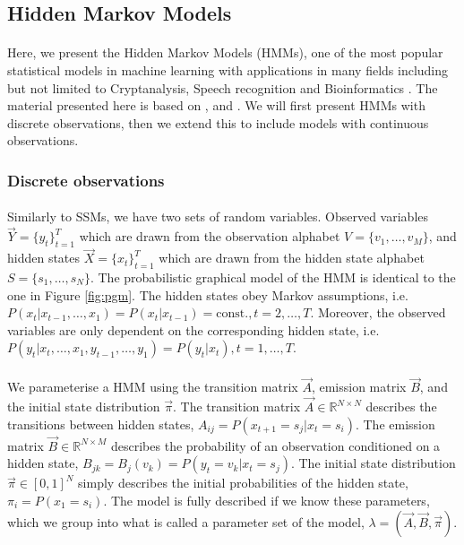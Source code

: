 \subsection{Hidden Markov Models}

\paragraph{}
	Here, we present the Hidden Markov Models (HMMs), one of the most popular statistical models in machine learning with applications in many fields including but not limited to Cryptanalysis, Speech recognition and Bioinformatics \cite{wiki:HMM}. The material presented here is based on \cite{rabiner1989tutorial}, \cite{ramage07} and \cite{mlBook}. We will first present HMMs with discrete observations, then we extend this to include models with continuous observations.
	
\subsubsection{Discrete observations}
\paragraph{}
	Similarly to SSMs, we have two sets of random variables. Observed variables $\vec Y = \{ y_t \}_{t = 1}^T$ which are drawn from the observation alphabet $V = \{v_1, \dotsc, v_M\}$, and hidden states $\vec X = \{ x_t \}_{t = 1}^T$ which are drawn from the hidden state alphabet $S = \{ s_1, \dotsc, s_N \}$. The probabilistic graphical model of the HMM is identical to the one in Figure \ref{fig:pgm}. The hidden states obey Markov assumptions, i.e. $P( x_t | x_{t - 1}, \dotsc, x_1) = P(x_t | x_{t - 1}) = \text{const.}, t = 2, \dotsc, T$. Moreover, the observed variables are only dependent on the corresponding hidden state, i.e. $P( y_t | x_t, \dotsc, x_1, y_{t - 1}, \dotsc, y_1) = P(y_t | x_t), t = 1, \dotsc, T$.
	
\paragraph{}
	We parameterise a HMM using the transition matrix $\vec A$, emission matrix $\vec B$, and the initial state distribution $\vec \pi$. The transition matrix $\vec A \in \mathbb{R}^{N \times N}$ describes the transitions between hidden states, $A_{ij} = P(x_{t + 1} = s_j | x_t = s_i)$. The emission matrix $\vec B \in \mathbb{R}^{N \times M}$ describes the probability of an observation conditioned on a hidden state, $B_{jk} = B_{j}(v_k) = P(y_t = v_k | x_t = s_j)$. The initial state distribution $\vec \pi \in [0, 1]^N$ simply describes the initial probabilities of the hidden state, $\pi_i = P(x_1 = s_i)$. The model is fully described if we know these parameters, which we group into what is called a parameter set of the model, $\lambda = (\vec A, \vec B, \vec \pi)$.
	
